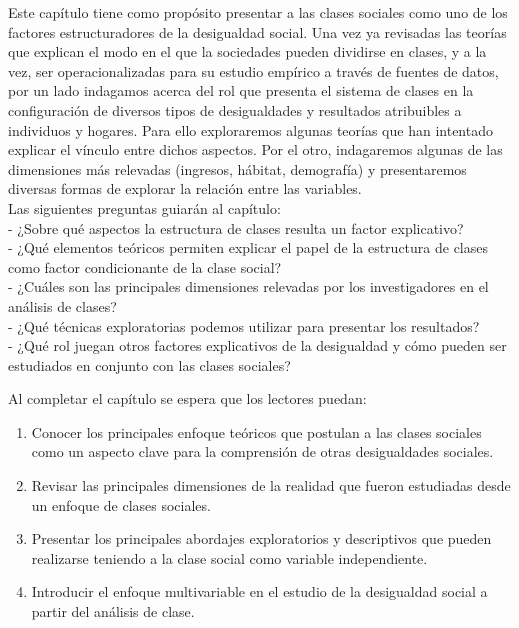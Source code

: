 \documentclass[
]{article}
\providecommand{\tightlist}{%
  \setlength{\itemsep}{0pt}\setlength{\parskip}{0pt}}
\begin{document}
Este capítulo tiene como propósito presentar a las clases sociales como uno de los factores estructuradores de la desigualdad social. Una vez ya revisadas las teorías que explican el modo en el que la sociedades pueden dividirse en clases, y a la vez, ser operacionalizadas para su estudio empírico a través de fuentes de datos, por un lado indagamos acerca del rol que presenta el sistema de clases en la configuración de diversos tipos de desigualdades y resultados atribuibles a individuos y hogares. Para ello exploraremos algunas teorías que han intentado explicar el vínculo entre dichos aspectos. Por el otro, indagaremos algunas de las dimensiones más relevadas (ingresos, hábitat, demografía) y presentaremos diversas formas de explorar la relación entre las variables.\\
Las siguientes preguntas guiarán al capítulo:\\
- ¿Sobre qué aspectos la estructura de clases resulta un factor explicativo?\\
- ¿Qué elementos teóricos permiten explicar el papel de la estructura de clases como factor condicionante de la clase social?\\
- ¿Cuáles son las principales dimensiones relevadas por los investigadores en el análisis de clases?\\
- ¿Qué técnicas exploratorias podemos utilizar para presentar los resultados?\\
- ¿Qué rol juegan otros factores explicativos de la desigualdad y cómo pueden ser estudiados en conjunto con las clases sociales?

Al completar el capítulo se espera que los lectores puedan:

\begin{enumerate}
\def\labelenumi{\arabic{enumi}.}
\tightlist
\item
  Conocer los principales enfoque teóricos que postulan a las clases sociales como un aspecto clave para la comprensión de otras desigualdades sociales.\\
\item
  Revisar las principales dimensiones de la realidad que fueron estudiadas desde un enfoque de clases sociales.\\
\item
  Presentar los principales abordajes exploratorios y descriptivos que pueden realizarse teniendo a la clase social como variable independiente.\\
\item
  Introducir el enfoque multivariable en el estudio de la desigualdad social a partir del análisis de clase.
\end{enumerate}
\end{document}

